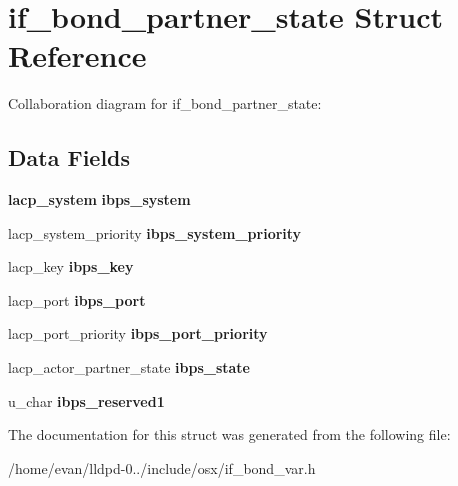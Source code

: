 \section{if\-\_\-bond\-\_\-partner\-\_\-state \-Struct \-Reference}
\label{structif__bond__partner__state}


\-Collaboration diagram for if\-\_\-bond\-\_\-partner\-\_\-state\-:
\subsection*{\-Data \-Fields}
\begin{DoxyCompactItemize}
\item 
{\bf lacp\-\_\-system} {\bfseries ibps\-\_\-system}\label{structif__bond__partner__state_ad0fcff5b0957032b80906010c105a044}

\item 
lacp\-\_\-system\-\_\-priority {\bfseries ibps\-\_\-system\-\_\-priority}\label{structif__bond__partner__state_a9df09e7b3bdce17a71998aa906a5b02d}

\item 
lacp\-\_\-key {\bfseries ibps\-\_\-key}\label{structif__bond__partner__state_a964a19e612638282d92abb8deaeca6b1}

\item 
lacp\-\_\-port {\bfseries ibps\-\_\-port}\label{structif__bond__partner__state_a74c0498fa682ae9747789a708140704a}

\item 
lacp\-\_\-port\-\_\-priority {\bfseries ibps\-\_\-port\-\_\-priority}\label{structif__bond__partner__state_acc1722a874be33323383f12091e50c90}

\item 
lacp\-\_\-actor\-\_\-partner\-\_\-state {\bfseries ibps\-\_\-state}\label{structif__bond__partner__state_aadcf6a8786f50db35f98afb58315aad5}

\item 
u\-\_\-char {\bfseries ibps\-\_\-reserved1}\label{structif__bond__partner__state_a5ca4a1479840552148079ce5942bcdde}

\end{DoxyCompactItemize}


\-The documentation for this struct was generated from the following file\-:\begin{DoxyCompactItemize}
\item 
/home/evan/lldpd-\/0../include/osx/if\-\_\-bond\-\_\-var.\-h\end{DoxyCompactItemize}
